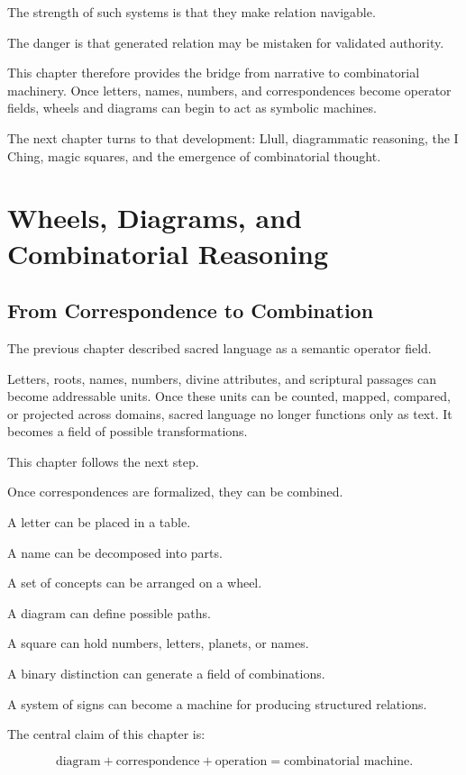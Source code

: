 \documentclass[11pt]{book}
\begin{document}
The strength of such systems is that they make relation navigable.

The danger is that generated relation may be mistaken for validated authority.

This chapter therefore provides the bridge from narrative to combinatorial machinery. Once letters, names, numbers, and correspondences become operator fields, wheels and diagrams can begin to act as symbolic machines.

The next chapter turns to that development: Llull, diagrammatic reasoning, the I Ching, magic squares, and the emergence of combinatorial thought.

\chapter{Wheels, Diagrams, and Combinatorial Reasoning}

\section{From Correspondence to Combination}

The previous chapter described sacred language as a semantic operator field.

Letters, roots, names, numbers, divine attributes, and scriptural passages can become addressable units. Once these units can be counted, mapped, compared, or projected across domains, sacred language no longer functions only as text. It becomes a field of possible transformations.

This chapter follows the next step.

Once correspondences are formalized, they can be combined.

A letter can be placed in a table.

A name can be decomposed into parts.

A set of concepts can be arranged on a wheel.

A diagram can define possible paths.

A square can hold numbers, letters, planets, or names.

A binary distinction can generate a field of combinations.

A system of signs can become a machine for producing structured relations.

The central claim of this chapter is:

\[
\text{diagram} + \text{correspondence} + \text{operation}
=
\text{combinatorial machine}.
\]
\end{document}
